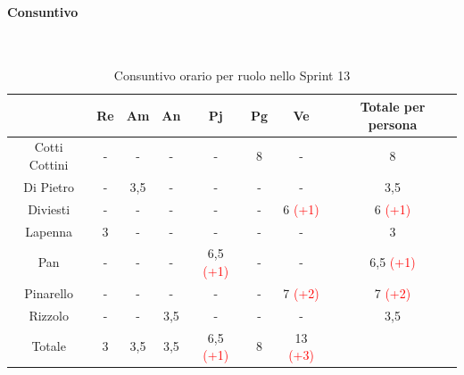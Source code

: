 \documentclass{article}
\begin{document}
                \paragraph{Consuntivo}\mbox{}\\
                \begin{table}[H]
                    \centering
                    \begin{tabular}{|c|c|c|c|c|c|c|c|}
                    \hline
                                  & Re  & Am  & An  & Pj  & Pg  & Ve  & Totale per persona \\ \hline
                    Cotti Cottini & -   & -   & -   & -   & 8  & -   & 8                 \\ \hline
                    Di Pietro     & -   & 3,5 & -   & -   & -   & -   & 3,5                \\ \hline
                    Diviesti      & -   & -   & -   & -   & -   & 6 \textcolor{red}{(+1)}   & 6 \textcolor{red}{(+1)}                  \\ \hline
                    Lapenna       & 3   & -   & -   & -   & -   & -   & 3                  \\ \hline
                    Pan           & -   & -   & -   & 6,5 \textcolor{red}{(+1)} & -   & -   & 6,5 \textcolor{red}{(+1)}               \\ \hline
                    Pinarello     & -   & -   & -   & -   & -   & 7 \textcolor{red}{(+2)}   & 7 \textcolor{red}{(+2)}                  \\ \hline
                    Rizzolo       & -   & -   & 3,5 & -   & -   & -   & 3,5                \\ \hline
                    Totale        & 3   & 3,5 & 3,5 & 6,5 \textcolor{red}{(+1)} & 8  & 13 \textcolor{red}{(+3)}  &                    \\ \hline
                    \end{tabular}
                    \caption{Consuntivo orario per ruolo nello Sprint 13}
                \end{table}

\end{document}

